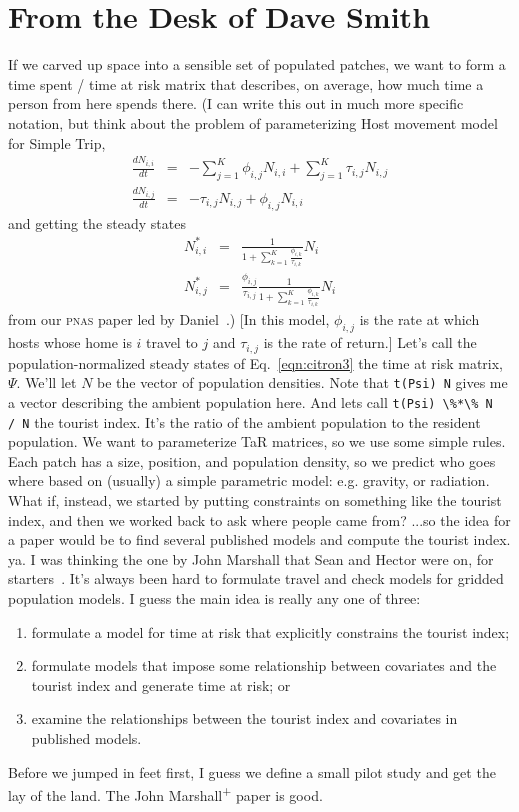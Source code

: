 \documentclass{article}
\begin{document}
\section{From the Desk of Dave Smith}\label{sec:davedesk}
If we carved up space into a sensible set of populated patches, we want to form a time spent / time at risk matrix that describes, on average, how much time a person from here spends there.
(I can write this out in much more specific notation, but think about the problem of parameterizing Host movement model for Simple Trip,
\begin{eqnarray}
\frac{dN_{i,i}}{dt}&=&-\sum_{j=1}^K \phi_{i,j}N_{i,i} + \sum_{j=1}^K \tau_{i,j}N_{i,j} \\
\frac{dN_{i,j}}{dt}&=&-\tau_{i,j}N_{i,j}+\phi_{i,j}N_{i,i}\label{eqn:citron2}
\end{eqnarray}
and getting the steady states
\begin{eqnarray}
N_{i,i}^* & = & \frac{1}{1+\sum_{k=1}^K\frac{\phi_{i,k}}{\tau_{i,k}}}N_i \\
N_{i,j}^* & = & \frac{\phi_{i,j}}{\tau_{i,j}} \frac{1}{1+\sum_{k=1}^K\frac{\phi_{i,k}}{\tau_{i,k}}} N_i\label{eqn:citron3}
\end{eqnarray}
from our \textsc{pnas} paper led by Daniel~\cite{Citron2021-jt}.) [In this model, $\phi_{i,j}$ is the rate at which hosts whose home is $i$ travel to $j$ and $\tau_{i,j}$ is the rate of return.]
Let's call the population-normalized steady states of Eq.~\ref{eqn:citron3} the time at risk matrix, $\Psi$. We'll let $N$ be the vector of population densities.
Note that \verb|t(Psi) N| gives me a vector describing the ambient population here.
And lets call \verb|t(Psi) \%*\% N  / N| the tourist index.
It's the ratio of the ambient population to the resident population.
We want to parameterize TaR matrices, so we use some simple rules. Each patch has a size, position, and population density, so we predict who goes where based on (usually) a simple parametric model: e.g. gravity, or radiation.
What if, instead, we started by putting constraints on something like the tourist index, and then we worked back to ask where people came from?
...so the idea for a paper would be to find several published models and compute the tourist index.
ya. I was thinking the one by John Marshall that Sean and Hector were on, for starters~\cite{Marshall2018-wf}.
It's always been hard to formulate travel and check models for gridded population models.
I guess the main idea is really any one of three:
\begin{enumerate}
  \item formulate a model for time at risk that explicitly constrains the tourist index;
  \item formulate models that impose some relationship between covariates and the tourist index and generate time at risk; or 
  \item examine the relationships between the tourist index and covariates in published models.
\end{enumerate}
Before we jumped in feet first, I guess we define a small pilot study and get the lay of the land. The John Marshall\textsuperscript{+} paper is good.
\end{document}

